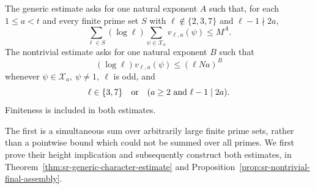 \begin{srdefinition}\label{def:sr-character-inputs}
The generic estimate asks for one natural exponent \(A\) such that,
for each \(1\leq a<t\) and every finite prime set \(S\) with
\(\ell\notin\{2,3,7\}\) and \(\ell-1\nmid2a\),
\begin{equation}\label{eq:sr-generic-count}
 \sum_{\ell\in S}(\log\ell)
       \sum_{\psi\in\mathcal X_a}v_{\ell,a}(\psi)\leq M^A .
\end{equation}
The nontrivial estimate asks for one natural exponent \(B\) such that
\begin{equation}\label{eq:sr-nontrivial-count}
 (\log\ell)v_{\ell,a}(\psi)\leq(\ell N a)^B
\end{equation}
whenever \(\psi\in\mathcal X_a,\ \psi\ne1,\ \ell\) is odd, and
\[
 \ell\in\{3,7\}\quad\hbox{or}\quad
                       (a\geq2\ \hbox{and }\ell-1\mid2a).
\]
Finiteness is included in both estimates.
\end{srdefinition}
The first is a simultaneous sum over arbitrarily large finite
prime sets, rather than a pointwise bound which could not be
summed over all primes. We first prove their height implication and subsequently construct
both estimates, in
Theorem~\ref{thm:sr-generic-character-estimate} and
Proposition~\ref{prop:sr-nontrivial-final-assembly}.


